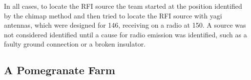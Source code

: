 \documentclass[a4paper,12pt]{article}
\begin{document}
                                                                                                                                                                                                                                                                            In all cases, to locate the RFI source the team started at the position identified by the chimap method and then tried to locate the RFI source with yagi antennas, which were designed for \unit{146}{\mega\hertz}, receiving on a radio at \unit{150}{\mega\hertz}. A source was not considered identified until a cause for radio emission was identified, such as a faulty ground connection or a broken insulator.

                                                                                                                                                                                                                                                                                                \subsection{A Pomegranate Farm}
                                                                                                                                                                                                                                                                                                                    \label{sec:apomegranatefarm}
\end{document}
